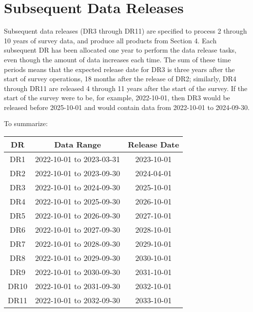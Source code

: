 \section{Subsequent Data Releases } \label{sect:drn}

Subsequent data releases (DR3 through DR11) are specified to process 2 through 10 years of survey data, and produce all products from \DPDD Section 4.
Each subsequent DR has been allocated one year to perform the data release tasks, even though the amount of data increases each time.
The sum of these time periods means that the expected release date for DR3 is three years after the start of survey operations, 18 months after the release of DR2; similarly, DR4 through DR11 are released 4 through 11 years after the start of the survey.
If the start of the survey were to be, for example, 2022-10-01, then DR3 would be released before 2025-10-01 and would contain data from 2022-10-01 to 2024-09-30.

To summarize:
\begin{tabular}{c c c}
DR & Data Range & Release Date \\
\hline
DR1 & 2022-10-01 to 2023-03-31 & 2023-10-01 \\
DR2 & 2022-10-01 to 2023-09-30 & 2024-04-01 \\
DR3 & 2022-10-01 to 2024-09-30 & 2025-10-01 \\
DR4 & 2022-10-01 to 2025-09-30 & 2026-10-01 \\
DR5 & 2022-10-01 to 2026-09-30 & 2027-10-01 \\
DR6 & 2022-10-01 to 2027-09-30 & 2028-10-01 \\
DR7 & 2022-10-01 to 2028-09-30 & 2029-10-01 \\
DR8 & 2022-10-01 to 2029-09-30 & 2030-10-01 \\
DR9 & 2022-10-01 to 2030-09-30 & 2031-10-01 \\
DR10 & 2022-10-01 to 2031-09-30 & 2032-10-01 \\
DR11 & 2022-10-01 to 2032-09-30 & 2033-10-01 \\
\end{tabular}

